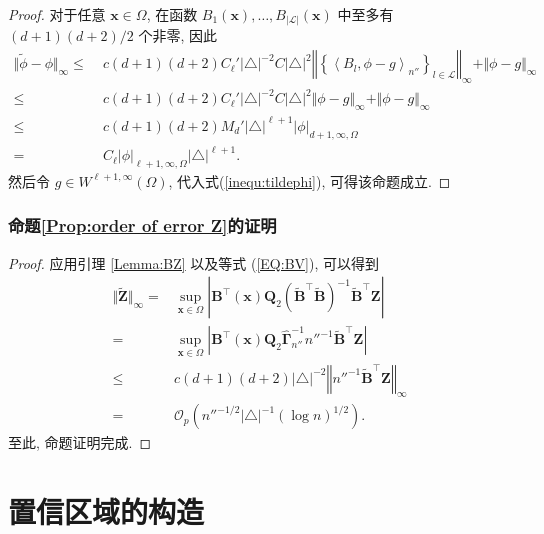 \documentclass[a4paper,openay,14pt]{ctexbook}
\numberwithin{equation}{section}
\numberwithin{lem}{section}
\newcommand{\chapterwithfancyheader}[1]{  
    \chapter{#1} %
    \thispagestyle{fancy} %
}
\begin{document}
\begin{proof}
对于任意 $\boldsymbol{x} \in \Omega$, 在函数 $B_1(\boldsymbol{x}), \dots, B_{\vert \mathcal{L} \vert}(\boldsymbol{x})$ 中至多有 $(d+1)(d+2)/2$ 个非零, 因此
\begin{align*}
\Vert \tilde{\phi} - \phi\Vert_{\infty}
\leq&\;
c(d+1)(d+2)C_\ell'
\vert\triangle\vert^{-2}
C\vert\triangle\vert^{2} 
\left\Vert
\left\{
\left\langle B_l,\phi-g\right\rangle_{n''}
\right\}_{l\in\mathcal{L}}
\right\Vert_{\infty}
+ \Vert\phi-g\Vert_{\infty}\\
\leq&\;
c(d+1)(d+2)C_\ell'
\vert\triangle\vert^{-2}
C\vert\triangle\vert^{2}
\Vert \phi-g\Vert_{\infty} 
+ \Vert\phi-g\Vert_{\infty}\\
\leq&\;
c(d+1)(d+2)M_d'
\vert\triangle\vert^{\ell+1}
\vert \phi\vert_{d+1,\infty,\Omega}\\
=&\;
C_\ell 
\vert\phi\vert_{\ell+1,\infty,\Omega}
\vert \triangle\vert^{\ell+1}.
\end{align*}
然后令 $g \in W^{\ell+1,\infty}(\Omega)$, 代入式(\ref{inequ:tildephi}), 可得该命题成立.
\end{proof}

\subsection{命题\ref{Prop:order of error Z}的证明}
\begin{proof}
    应用引理 \ref{Lemma:BZ} 以及等式 (\ref{EQ:BV}), 可以得到
\begin{align*}
    \Vert \tilde{\boldsymbol{Z}}\Vert_{\infty} = &\sup_{\boldsymbol{x}\in\Omega}\left\vert\boldsymbol{B}^{\top}(\boldsymbol{x})\boldsymbol{Q}_2\left(\tilde{\boldsymbol{B}}^{\top}\tilde{\boldsymbol{B}}\right)^{-1}\tilde{\boldsymbol{B}}^{\top}\boldsymbol{Z}\right\vert\\
    =&\sup_{\boldsymbol{x}\in\Omega}\left\vert{\boldsymbol{B}}^{\top}(\boldsymbol{x})\boldsymbol{Q}_2\hat{\bm{\Gamma}}^{-1}_{n''}{n''^{-1}\tilde{\boldsymbol{B}}}^{\top}\boldsymbol{Z}\right\vert\\
    \leq & c(d+1)(d+2)\vert\triangle\vert^{-2}\left\Vert n''^{-1}\tilde{\boldsymbol{B}}^{\top}\boldsymbol{Z}\right\Vert_{\infty}\\
    =& \mathcal{O}_p\left(n''^{-1/2}\vert\triangle\vert^{-1}(\log n)^{1/2}\right).
\end{align*}
至此, 命题证明完成.
\end{proof}

\chapterwithfancyheader{置信区域的构造}\label{SEC: estimate}
\end{document}
